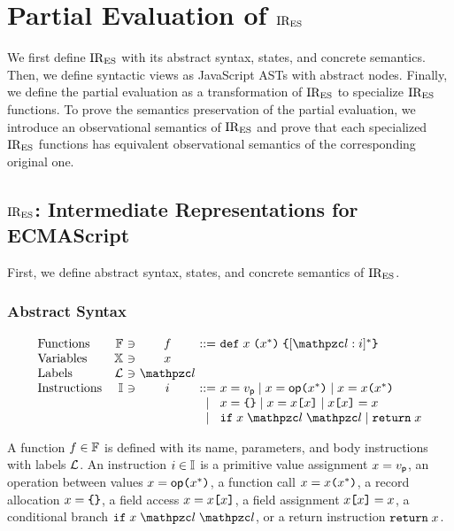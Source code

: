 \section{Partial Evaluation of $\text{IR}_\text{ES}$}\label{sec:formal}

We first define $\text{IR}_\text{ES}$ with its abstract syntax, states, and concrete
semantics.  Then, we define syntactic views as JavaScript ASTs with abstract
nodes. Finally, we define the partial evaluation as a transformation of $\text{IR}_\text{ES}$
to specialize $\text{IR}_\text{ES}$ functions.  To prove the semantics preservation of the
partial evaluation, we introduce an observational semantics of $\text{IR}_\text{ES}$ and prove
that each specialized $\text{IR}_\text{ES}$ functions has equivalent observational semantics
of the corresponding original one.

\subsection{$\text{IR}_\text{ES}$: Intermediate Representations for ECMAScript}

First, we define abstract syntax, states, and concrete semantics of $\text{IR}_\text{ES}$.

\subsubsection{Abstract Syntax}

\[
  \begin{array}{lr@{~}c@{~}c@{~}c@{~}l}
    \text{Functions} & \funcset &\ni& \func &::=&
    \kwdef \; x \; \kwrl x^* \kwrr \; \kwcl [\lab: \inst]^* \kwcr\\
    \text{Variables} & \varset &\ni& x\\
    \text{Labels} & \labset &\ni& \lab\\
    \text{Instructions} & \instset &\ni& \inst &::=&
    x = \pval \mid
    x = \op \kwrl x^* \kwrr \mid
    x = x \kwrl x^* \kwrr\\
    &&&&\mid&
    x = \kwcl \kwcr \mid
    x = x \kwsl x \kwsr \mid
    x \kwsl x \kwsr = x\\
    &&&&\mid&
    \kwif \; x \; \lab \; \lab \mid
    \kwret \; x\\
  \end{array}
\]

A function $f \in \mathbb{F}$ is defined with its name, parameters, and body
instructions with labels $\mathcal{L}$.  An instruction $i \in \mathbb{I}$ is
a primitive value assignment $x = v_{\textsf{p}}$,
an operation between values $x = \textsf{op} \texttt{(} x^* \texttt{)}$,
a function call $x = x \texttt{(} x^* \texttt{)}$,
a record allocation $x = \texttt{\{} \texttt{\}}$,
a field access $x = x \texttt{[} x \texttt{]}$,
a field assignment $x \texttt{[} x \texttt{]} = x$,
a conditional branch $\kwif \; x \; \lab \; \lab$,
or a return instruction $\texttt{return} \; x$.


